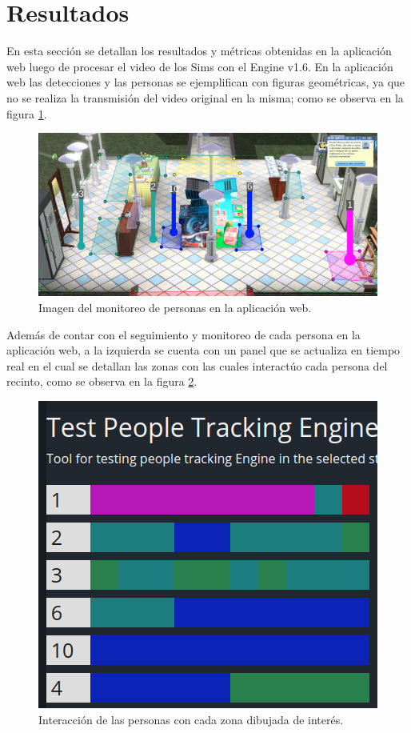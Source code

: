 \section{Resultados}
\label{sec:resultados}

En esta sección se detallan los resultados y métricas obtenidas en la aplicación web luego de procesar el video de los Sims con el Engine v1.6. En la aplicación web las detecciones y las personas se ejemplifican con figuras geométricas, ya que no se realiza la transmisión del video original en la misma; como se observa en la figura \ref{fig:simsWebApp}.

\begin{figure}[ht]
	\centering
	\includegraphics[scale=.60]{./Figures/simsWebApp.png}
	\caption{Imagen del monitoreo de personas en la aplicación web.}
	\label{fig:simsWebApp}
\end{figure}

Además de contar con el seguimiento y monitoreo de cada persona en la aplicación web, a la izquierda se cuenta con un panel que se actualiza en tiempo real en el cual se detallan las zonas con las cuales interactúo cada persona del recinto, como se observa en la figura \ref{fig:simsWebApp2}.

\begin{figure}[ht]
	\centering
	\includegraphics[scale=.60]{./Figures/simsWebApp2.png}
	\caption{Interacción de las personas con cada zona dibujada de interés.}
	\label{fig:simsWebApp2}
\end{figure}

